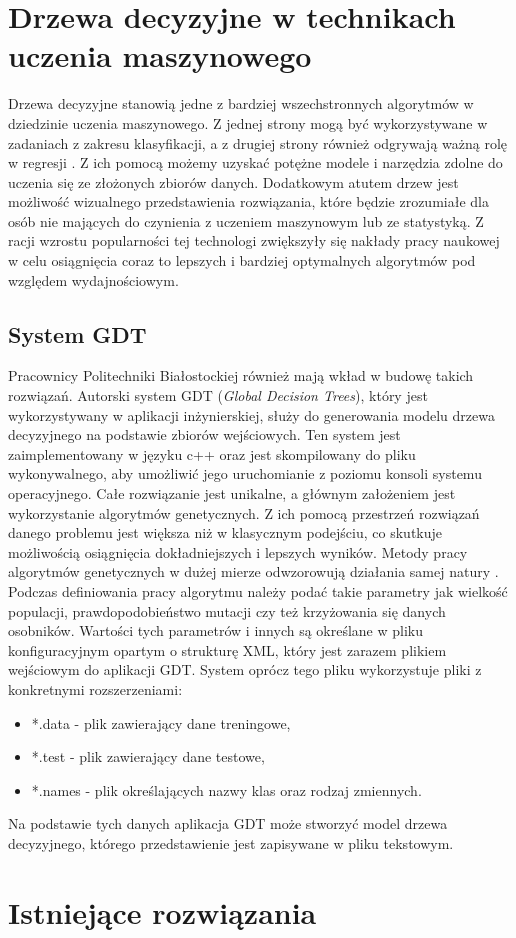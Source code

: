 \section{Drzewa decyzyjne w technikach uczenia maszynowego}

Drzewa decyzyjne stanowią jedne z bardziej wszechstronnych algorytmów w  dziedzinie uczenia maszynowego. Z jednej strony mogą być wykorzystywane w zadaniach z zakresu klasyfikacji, a z drugiej strony również odgrywają ważną rolę w regresji \cite{book_1}. Z ich pomocą możemy uzyskać potężne modele i narzędzia zdolne do uczenia się ze złożonych zbiorów danych. Dodatkowym atutem drzew jest możliwość wizualnego przedstawienia rozwiązania, które będzie zrozumiałe dla osób nie mających do czynienia z uczeniem maszynowym lub ze statystyką. Z racji wzrostu popularności tej technologi zwiększyły się nakłady pracy naukowej w celu osiągnięcia coraz to lepszych i bardziej optymalnych algorytmów pod względem wydajnościowym. 

\subsection{System GDT}
Pracownicy Politechniki Białostockiej również mają wkład w budowę takich rozwiązań. Autorski system GDT (\textit{Global Decision Trees}), który jest wykorzystywany w aplikacji inżynierskiej, służy do generowania modelu drzewa decyzyjnego na podstawie zbiorów wejściowych. Ten system jest zaimplementowany w języku c++ oraz jest skompilowany do pliku wykonywalnego, aby umożliwić jego uruchomianie z poziomu konsoli systemu operacyjnego. Całe rozwiązanie jest unikalne, a głównym założeniem jest wykorzystanie algorytmów genetycznych. Z ich pomocą przestrzeń rozwiązań danego problemu jest większa niż w klasycznym podejściu, co skutkuje możliwością osiągnięcia dokładniejszych i lepszych wyników. Metody pracy algorytmów genetycznych w dużej mierze odwzorowują działania samej natury \cite{book_2}. Podczas definiowania pracy algorytmu należy podać takie parametry jak wielkość populacji, prawdopodobieństwo mutacji czy też krzyżowania się danych osobników. Wartości tych parametrów i innych są określane w pliku konfiguracyjnym opartym o strukturę XML, który jest zarazem plikiem wejściowym do aplikacji GDT. System oprócz tego pliku wykorzystuje pliki z konkretnymi rozszerzeniami:
\begin{itemize}
	\item *.data - plik zawierający dane treningowe, 
	\item *.test - plik zawierający dane testowe,
	\item *.names - plik określających nazwy klas oraz rodzaj zmiennych.
\end{itemize}
Na podstawie tych danych aplikacja GDT może stworzyć model drzewa decyzyjnego, którego przedstawienie jest zapisywane w pliku tekstowym. 

\section{Istniejące rozwiązania}